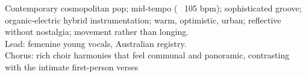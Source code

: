 

\begin{notes}
\end{notes}

\begin{style}
Contemporary cosmopolitan pop; mid-tempo (~ 105 bpm); sophisticated groove; organic-electric hybrid instrumentation; warm, optimistic, urban; reflective without nostalgia; movement rather than longing.\\
Lead: femenine young vocals, Australian registry.\\
Chorus: rich choir harmonies that feel communal and panoramic, contrasting with the intimate first-person verses
\end{style}

